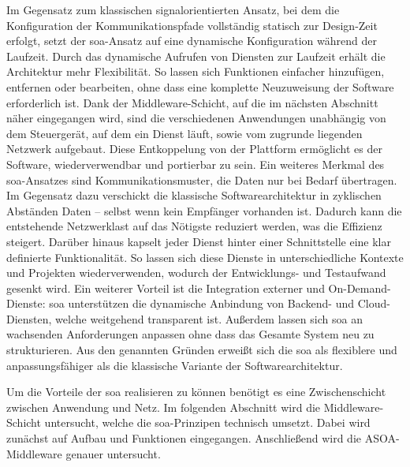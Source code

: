 Im Gegensatz zum klassischen signalorientierten Ansatz, bei dem die Konfiguration der Kommunikationspfade vollständig statisch zur Design-Zeit erfolgt, setzt der \gls{soa}-Ansatz auf eine dynamische Konfiguration während der Laufzeit. Durch das dynamische Aufrufen von Diensten zur Laufzeit erhält die Architektur mehr Flexibilität. So lassen sich Funktionen einfacher hinzufügen, entfernen oder bearbeiten, ohne dass eine komplette Neuzuweisung der Software erforderlich ist. Dank der Middleware-Schicht, auf die im nächsten Abschnitt näher eingegangen wird, sind die verschiedenen Anwendungen unabhängig von dem Steuergerät, auf dem ein Dienst läuft, sowie vom zugrunde liegenden Netzwerk aufgebaut. Diese Entkoppelung von der Plattform ermöglicht es der Software, wiederverwendbar und portierbar zu sein. Ein weiteres Merkmal des \gls{soa}-Ansatzes sind Kommunikationsmuster, die Daten nur bei Bedarf übertragen. Im Gegensatz dazu verschickt die klassische Softwarearchitektur in zyklischen Abständen Daten – selbst wenn kein Empfänger vorhanden ist. Dadurch kann die entstehende Netzwerklast auf das Nötigste reduziert werden, was die Effizienz  steigert. Darüber hinaus kapselt jeder Dienst hinter einer Schnittstelle eine klar definierte Funktionalität. So lassen sich diese Dienste in unterschiedliche Kontexte und Projekten wiederverwenden, wodurch der Entwicklungs- und Testaufwand gesenkt wird. Ein weiterer Vorteil ist die Integration externer und On-Demand-Dienste: \gls{soa} unterstützen die dynamische Anbindung von Backend- und Cloud-Diensten, welche weitgehend transparent ist. Außerdem lassen sich \gls{soa} an wachsenden Anforderungen anpassen ohne dass das Gesamte System neu zu strukturieren. Aus den genannten Gründen erweißt sich die \gls{soa} als flexiblere und anpassungsfähiger als die klassische Variante der Softwarearchitektur.

Um die Vorteile der \gls{soa} realisieren zu können benötigt es eine Zwischenschicht zwischen Anwendung und Netz. Im folgenden Abschnitt wird die Middleware-Schicht untersucht, welche die \gls{soa}-Prinzipen technisch umsetzt. Dabei wird zunächst auf Aufbau und Funktionen eingegangen. Anschließend wird die ASOA-Middleware genauer untersucht.


